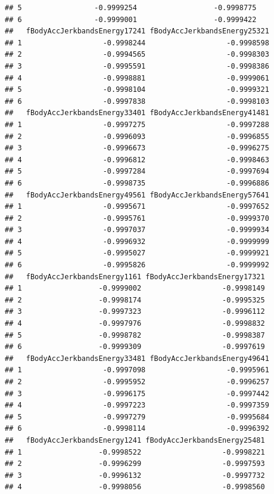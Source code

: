 \documentclass[
]{article}
\begin{document}
\begin{verbatim}
## 5                 -0.9999254                  -0.9998775
## 6                 -0.9999001                  -0.9999422
##   fBodyAccJerkbandsEnergy17241 fBodyAccJerkbandsEnergy25321
## 1                   -0.9998244                   -0.9998598
## 2                   -0.9994565                   -0.9998303
## 3                   -0.9995591                   -0.9998386
## 4                   -0.9998881                   -0.9999061
## 5                   -0.9998104                   -0.9999321
## 6                   -0.9997838                   -0.9998103
##   fBodyAccJerkbandsEnergy33401 fBodyAccJerkbandsEnergy41481
## 1                   -0.9997275                   -0.9997288
## 2                   -0.9996093                   -0.9996855
## 3                   -0.9996673                   -0.9996275
## 4                   -0.9996812                   -0.9998463
## 5                   -0.9997284                   -0.9997694
## 6                   -0.9998735                   -0.9996886
##   fBodyAccJerkbandsEnergy49561 fBodyAccJerkbandsEnergy57641
## 1                   -0.9995671                   -0.9997652
## 2                   -0.9995761                   -0.9999370
## 3                   -0.9997037                   -0.9999934
## 4                   -0.9996932                   -0.9999999
## 5                   -0.9995027                   -0.9999921
## 6                   -0.9995826                   -0.9999992
##   fBodyAccJerkbandsEnergy1161 fBodyAccJerkbandsEnergy17321
## 1                  -0.9999002                   -0.9998149
## 2                  -0.9998174                   -0.9995325
## 3                  -0.9997323                   -0.9996112
## 4                  -0.9997976                   -0.9998832
## 5                  -0.9998782                   -0.9998387
## 6                  -0.9999309                   -0.9997619
##   fBodyAccJerkbandsEnergy33481 fBodyAccJerkbandsEnergy49641
## 1                   -0.9997098                   -0.9995961
## 2                   -0.9995952                   -0.9996257
## 3                   -0.9996175                   -0.9997442
## 4                   -0.9997223                   -0.9997359
## 5                   -0.9997279                   -0.9995684
## 6                   -0.9998114                   -0.9996392
##   fBodyAccJerkbandsEnergy1241 fBodyAccJerkbandsEnergy25481
## 1                  -0.9998522                   -0.9998221
## 2                  -0.9996299                   -0.9997593
## 3                  -0.9996132                   -0.9997732
## 4                  -0.9998056                   -0.9998560

\end{verbatim}
\end{document}
